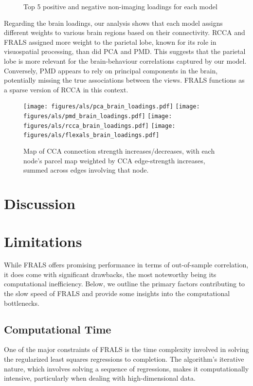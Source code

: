 \begin{figure}[h]
\centering

\label{fig:behaviour}
\caption*{Top 5 positive and negative non-imaging loadings for each model}
\end{figure}

Regarding the brain loadings, our analysis shows that each model assigns different weights to various brain regions
based on their connectivity.
RCCA and FRALS assigned more weight to the parietal lobe, known for its role in visuospatial processing, than did PCA and PMD. This suggests that the parietal lobe is more relevant for the brain-behaviour correlations captured by our model.
Conversely, PMD appears to rely on principal components in the brain, potentially missing the true associations between the views.
FRALS functions as a sparse version of RCCA in this context.

\begin{figure}[h]
\centering
\texttt{[image: figures/als/pca\_brain\_loadings.pdf]}
\texttt{[image: figures/als/pmd\_brain\_loadings.pdf]}
\texttt{[image: figures/als/rcca\_brain\_loadings.pdf]}
\texttt{[image: figures/als/flexals\_brain\_loadings.pdf]}
\caption*{Map of CCA connection strength increases/decreases, with each node’s parcel map weighted by CCA edge-strength increases, summed across edges involving that node.}
\label{fig:brain}
\end{figure}

\section{Discussion}


\section{Limitations}\label{sec:limitations}

While FRALS offers promising performance in terms of out-of-sample correlation, it does come with significant drawbacks, the most noteworthy being its computational inefficiency. Below, we outline the primary factors contributing to the slow speed of FRALS and provide some insights into the computational bottlenecks.

\subsection{Computational Time}\label{subsec:computational-time}
One of the major constraints of FRALS is the time complexity involved in solving the regularized least squares regressions to completion. The algorithm’s iterative nature, which involves solving a sequence of regressions, makes it computationally intensive, particularly when dealing with high-dimensional data.

